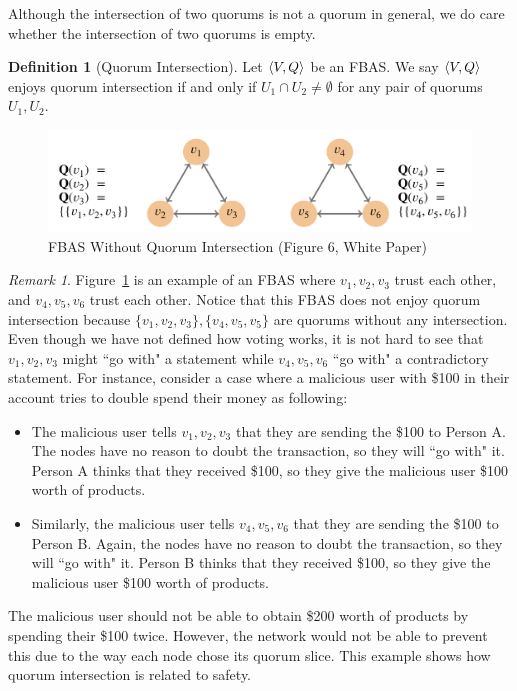 \documentclass[12pt, psamsfonts]{amsart}
\theoremstyle{definition}
\newtheorem{defn}[thm]{Definition}
\theoremstyle{remark}
\newtheorem{rem}[thm]{Remark}
\numberwithin{equation}{subsection}
\begin{document}
Although the intersection of two quorums is not a quorum in general, we do care whether the intersection of two quorums is empty.

\begin{defn}[Quorum Intersection]
    Let $\ev{V, Q}$ be an FBAS\@.
    We say $\ev{V, Q}$ enjoys quorum intersection if and only if $U_1 \cap U_2 \ne \emptyset$ for any pair of quorums $U_1, U_2$.
\end{defn}

\begin{figure}[!htb]
    \includegraphics[width=.7\linewidth]{img/quorum_intersection.jpeg}
    \caption{FBAS Without Quorum Intersection (Figure 6, White Paper)}
    \label{fig:fbas_without_quorum_intersection}
\end{figure}

\begin{rem}
    Figure~\ref{fig:fbas_without_quorum_intersection} is an example of an FBAS where $v_1, v_2, v_3$ trust each other, and $v_4, v_5, v_6$ trust each other.
    Notice that this FBAS does not enjoy quorum intersection because $\{ v_1, v_2, v_3 \}, \{ v_4, v_5, v_5 \}$ are quorums without any intersection.
    Even though we have not defined how voting works, it is not hard to see that $v_1, v_2, v_3$ might ``go with" a statement while $v_4, v_5, v_6$ ``go with" a contradictory statement.
    For instance, consider a case where a malicious user with \$100 in their account tries to double spend their money as following:
    \begin{itemize}
        \item
            The malicious user tells $v_1, v_2, v_3$ that they are sending the \$100 to Person A.
            The nodes have no reason to doubt the transaction, so they will ``go with" it.
            Person A thinks that they received \$100, so they give the malicious user \$100 worth of products.
        \item
            Similarly, the malicious user tells $v_4, v_5, v_6$ that they are sending the \$100 to Person B.
            Again, the nodes have no reason to doubt the transaction, so they will ``go with" it.
            Person B thinks that they received \$100, so they give the malicious user \$100 worth of products.
    \end{itemize}
    The malicious user should not be able to obtain \$200 worth of products by spending their \$100 twice.
    However, the network would not be able to prevent this due to the way each node chose its quorum slice.
    This example shows how quorum intersection is related to safety.
\end{rem}
\end{document}
